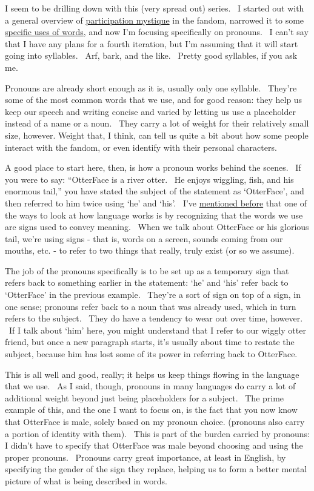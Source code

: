 I seem to be drilling down with this (very spread out) series. ~I
started out with a general overview of
\href{http://adjectivespecies.com/2012/01/25/participation-mystique/}{participation
mystique} in the fandom, narrowed it to some
\href{http://adjectivespecies.com/2012/02/08/participation-mystique-2-on-words/}{specific
uses of words}, and now I'm focusing specifically on pronouns. ~I can't
say that I have any plans for a fourth iteration, but I'm assuming that
it will start going into syllables. ~Arf, bark, and the like. ~Pretty
good syllables, if you ask me.

Pronouns are already short enough as it is, usually only one syllable.
~They're some of the most common words that we use, and for good reason:
they help us keep our speech and writing concise and varied by letting
us use a placeholder instead of a name or a noun. ~They carry a lot of
weight for their relatively small size, however. Weight that, I think,
can tell us quite a bit about how some people interact with the fandom,
or even identify with their personal characters.

A good place to start here, then, is how a pronoun works behind the
scenes. ~If you were to say: ``OtterFace is a river otter. ~He enjoys
wiggling, fish, and his enormous tail,'' you have stated the subject of
the statement as `OtterFace', and then referred to him twice using `he'
and `his'. ~I've
\href{http://adjectivespecies.com/2012/04/12/meaning-within-a-subculture-part-2/}{mentioned
before} that one of the ways to look at how language works is by
recognizing that the words we use are signs used to convey meaning.
~When we talk about OtterFace or his glorious tail, we're using signs -
that is, words on a screen, sounds coming from our mouths, etc. - to
refer to two things that really, truly exist (or so we assume).

The job of the pronouns specifically is to be set up as a temporary sign
that refers back to something earlier in the statement: `he' and `his'
refer back to `OtterFace' in the previous example. ~They're a sort of
sign on top of a sign, in one sense; pronouns refer back to a noun that
was already used, which in turn refers to the subject. ~They do have a
tendency to wear out over time, however. ~If I talk about `him' here,
you might understand that I refer to our wiggly otter friend, but once a
new paragraph starts, it's usually about time to restate the subject,
because him has lost some of its power in referring back to OtterFace.

This is all well and good, really; it helps us keep things flowing in
the language that we use. ~As I said, though, pronouns in many languages
do carry a lot of additional weight beyond just being placeholders for a
subject. ~The prime example of this, and the one I want to focus on, is
the fact that you now know that OtterFace is male, solely based on my
pronoun choice. (pronouns also carry a portion of identity with them).
~This is part of the burden carried by pronouns: I didn't have to
specify that OtterFace was male beyond choosing and using the proper
pronouns. ~Pronouns carry great importance, at least in English, by
specifying the gender of the sign they replace, helping us to form a
better mental picture of what is being described in words.

